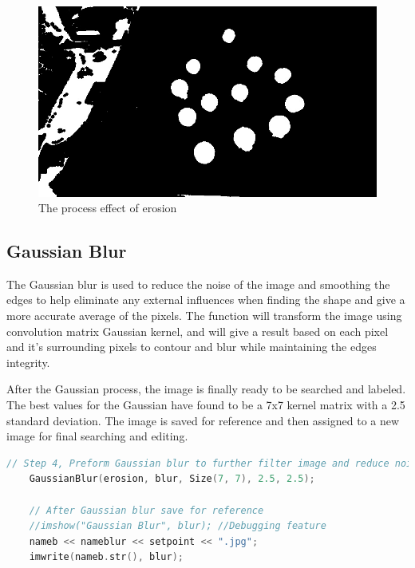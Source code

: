 \documentclass[a4paper, 10pt]{article}
\begin{document}
\begin{figure}[H]
  \includegraphics[width=\linewidth]{images/Erosion}
  \caption{The process effect of erosion}
  \label{fig:The process effect of erosion}
\end{figure}

\clearpage
\subsection{Gaussian Blur}

The Gaussian blur is used to reduce the noise of the image and smoothing the edges to help eliminate any external influences when finding the shape and give a more accurate average of the pixels. The function will transform the image using convolution matrix Gaussian kernel, and will give a result based on each pixel and it's surrounding pixels to contour and blur while maintaining the edges integrity.

After the Gaussian process, the image is finally ready to be searched and labeled. The best values for the Gaussian have found to be a 7x7 kernel matrix with a 2.5 standard deviation. The image is saved for reference and then assigned to a new image for final searching and editing.

\begin{lstlisting}[language = C++]
	// Step 4, Preform Gaussian blur to further filter image and reduce noise to better detect the around point for the circles
	GaussianBlur(erosion, blur, Size(7, 7), 2.5, 2.5);

	// After Gaussian blur save for reference
	//imshow("Gaussian Blur", blur); //Debugging feature
	nameb << nameblur << setpoint << ".jpg";
	imwrite(nameb.str(), blur);		
\end{lstlisting}
\end{document}
